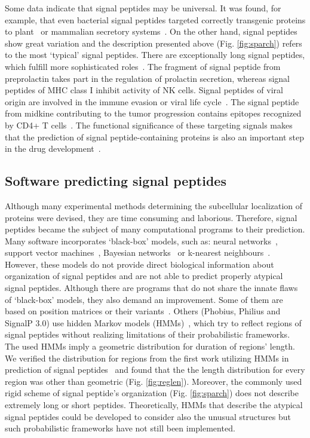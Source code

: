 \documentclass[fleqn,10pt,twoside]{gcb15submission}
\begin{document}
Some data indicate that signal peptides may be universal. It was found, for example, that even bacterial signal peptides targeted correctly transgenic proteins to plant~\citep{2009moellera} or mammalian secretory systems~\citep{2014naganoestablishment}. On the other hand, signal peptides show great variation and the description presented above (Fig. \ref{fig:sparch}) refers to the most ‘typical’ signal peptides. There are  exceptionally long signal peptides, which fulfill more sophisticated roles~\citep{2009hissarchitecture}. The fragment of signal peptide from preprolactin takes part in the regulation of prolactin secretion, whereas signal peptides of MHC class I inhibit activity of NK cells. Signal peptides of viral origin are involved in the immune evasion or viral life cycle~\citep{2000kappposttargeting}. The signal peptide from midkine contributing to the tumor progression contains epitopes recognized by CD4+ T cells~\citep{2013kerzerhothe}. The functional significance of these targeting signals makes that the prediction of signal peptide-containing proteins is also an important step in the drug development~\citep{2005zhangalteration, 2012netoadeimproving, 2010moellerwetmilling}.


\subsection*{Software predicting signal peptides}

Although many experimental methods determining the subcellular localization of proteins were devised, they are time consuming and laborious. Therefore, signal peptides became the subject of many computational programs to their prediction. Many software incorporates ‘black-box’ models, such as: neural networks~\citep{2011petersensignalp}, support vector machines~\citep{2014zhangprediction}, Bayesian networks~\citep{2012zhengsignalbnf} or k-nearest neighbours~\citep{2007shensignall}. However, these models do not provide direct biological information about organization of signal peptides and are not able to predict properly atypical signal peptides. Although there are programs that do not share the innate flaws of ‘black-box’ models, they also demand an improvement. Some of them are based on position matrices or their variants~\citep{2014zhangprediction, 2004hillerpredisi}. Others (Phobius, Philius and SignalP 3.0) use hidden Markov models (HMMs)~\citep{2004klla, 2008reynoldstransmembrane, 2004bendtsenimproved}, which try to reflect regions of signal peptides without realizing limitations of their probabilistic frameworks. The used HMMs imply a geometric distribution for duration of regions' length. We verified the distribution for regions from the first work utilizing HMMs in prediction of signal peptides~\citep{1998nielsenprediction} and found that the the length distribution for every region was other than geometric (Fig. \ref{fig:reglen}). Moreover, the commonly used rigid scheme of signal peptide's organization (Fig. \ref{fig:sparch}) does not describe extremely long or short peptides. Theoretically, HMMs that describe the atypical signal peptides could be developed to consider also the unusual structures but such probabilistic frameworks have not still been implemented.
\end{document}
